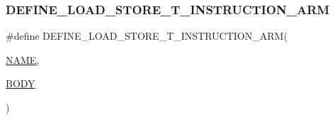 \subsubsection{\texorpdfstring{D\+E\+F\+I\+N\+E\+\_\+\+L\+O\+A\+D\+\_\+\+S\+T\+O\+R\+E\+\_\+\+T\+\_\+\+I\+N\+S\+T\+R\+U\+C\+T\+I\+O\+N\+\_\+\+A\+RM}{DEFINE\_LOAD\_STORE\_T\_INSTRUCTION\_ARM}}
{\footnotesize\ttfamily \#define D\+E\+F\+I\+N\+E\+\_\+\+L\+O\+A\+D\+\_\+\+S\+T\+O\+R\+E\+\_\+\+T\+\_\+\+I\+N\+S\+T\+R\+U\+C\+T\+I\+O\+N\+\_\+\+A\+RM(\begin{DoxyParamCaption}\item[{}]{\mbox{\hyperlink{inflate_8h_a164ea0159d5f0b5f12a646f25f99eceaa67bc2ced260a8e43805d2480a785d312}{N\+A\+ME}},  }\item[{}]{\mbox{\hyperlink{gzlog_8c_aa6bdf6a6d9916c343e1e17774d84a156}{B\+O\+DY}} }\end{DoxyParamCaption})}

